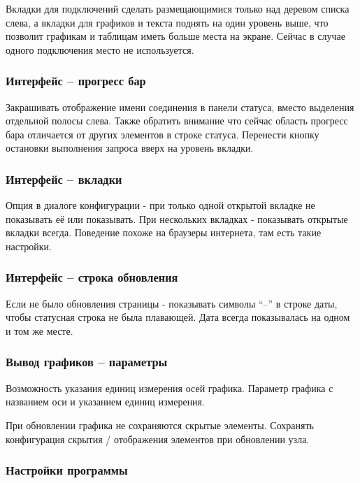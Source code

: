 Вкладки для подключений сделать размещающимися только над деревом списка слева, а вкладки для
графиков и текста поднять на один уровень выше, что позволит графикам и таблицам иметь больше места
на экране. Сейчас в случае одного подключения место не используется.

\subsubsection{Интерфейс -- прогресс бар}

Закрашивать отображение имени соединения в панели статуса, вместо выделения отдельной полосы слева.
Также обратить внимание что сейчас область прогресс бара отличается от других элементов в строке
статуса. Перенести кнопку остановки выполнения запроса вверх на уровень вкладки.

\subsubsection{Интерфейс -- вкладки}

Опция в диалоге конфигурации - при только одной открытой вкладке не показывать её или показывать.
При нескольких вкладках - показывать открытые вкладки всегда. Поведение похоже на браузеры
интернета, там есть такие настройки.

\subsubsection{Интерфейс -- строка обновления}

Если не было обновления страницы - показывать символы ``--'' в строке даты, чтобы статусная строка
не была плавающей. Дата всегда показывалась на одном и том же месте.

\subsubsection{Вывод графиков -- параметры}

Возможность указания единиц измерения осей графика. Параметр графика с названием оси и указанием
единиц измерения.

\bigskip

При обновлении графика не сохраняются скрытые элементы. Сохранять конфигурация скрытия / отображения
элементов при обновлении узла.

\subsubsection{Настройки программы}

